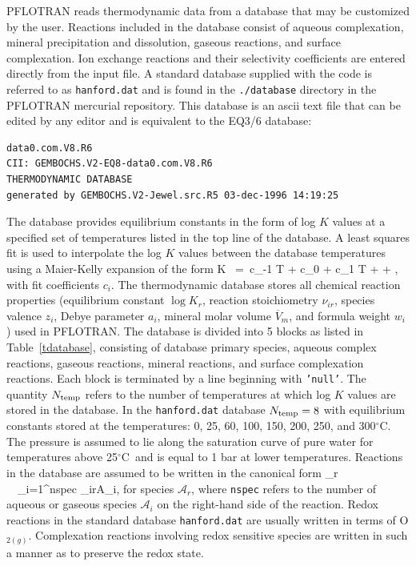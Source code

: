 \documentclass[12pt]{article}
\def\EQ#1\EN{\begin{equation}#1\end{equation}}
\newcommand{\degc}{$^\circ$C}
\newcommand{\eq}{\ =\ }
\newcommand{\A}{{\mathcal A}}
\newcommand{\arrows}{~\rightleftharpoons~}
\begin{document}
PFLOTRAN reads thermodynamic data from a database that may be customized by the user. Reactions included in the database consist of aqueous complexation, mineral precipitation and dissolution, gaseous reactions, and surface complexation. Ion exchange reactions and their selectivity coefficients are entered directly from the input file. 
A standard database supplied with the code is referred to as {\tt hanford.dat} and is found in the {\tt ./database} directory in the PFLOTRAN mercurial repository. This database is an ascii text file that can be edited by any editor and is equivalent to the EQ3/6 database:
\begin{verbatim}
data0.com.V8.R6
CII: GEMBOCHS.V2-EQ8-data0.com.V8.R6
THERMODYNAMIC DATABASE
generated by GEMBOCHS.V2-Jewel.src.R5 03-dec-1996 14:19:25
\end{verbatim}
The database provides equilibrium constants in the form of log $K$ values at a specified set of temperatures listed in the top line of the database. A least squares fit is used to interpolate the log $K$ values between the database temperatures using a Maier-Kelly expansion of the form
\EQ\label{mk}
\log K \eq c_{-1} \ln T + c_0 + c_1 T +  + ,
\EN
with fit coefficients $c_i$. 
The thermodynamic database stores all chemical reaction properties (equilibrium constant $\log K_r$, reaction stoichiometry $\nu_{ir}$, species valence $z_i$, Debye parameter $a_i$, mineral molar volume $\overline V_m$, and formula weight $w_i$) used in PFLOTRAN. The database is divided into 5 blocks as listed in Table~\ref{tdatabase}, consisting of
database primary species, aqueous complex reactions, gaseous reactions, mineral reactions, and surface complexation reactions. 
Each block is terminated by a line beginning with {\tt 'null'}. 
The quantity $N_{\rm temp}$ refers to the number of temperatures at which log $K$ values are stored in the database.
In the {\tt hanford.dat} database $N_{\rm temp}=8$ with equilibrium constants stored at the temperatures: 0, 25, 60, 100, 150, 200, 250, and 300\degc. The pressure is assumed to lie along the saturation curve of pure water for temperatures above 25\degc\ and is equal to 1 bar at lower temperatures.
Reactions in the database are assumed to be written in the canonical form
\EQ
\A_r \arrows \sum_{i=1}^{\rm nspec} \nu_{ir}\A_i,
\EN
for species $\A_r$, where {\tt nspec} refers to the number of aqueous or gaseous species $\A_i$ on the right-hand side of the reaction. 
Redox reactions in the standard database {\tt hanford.dat} are usually written in terms of O$_{2(g)}$.
Complexation reactions involving redox sensitive species are written in such a manner as to preserve the redox state.
\end{document}
